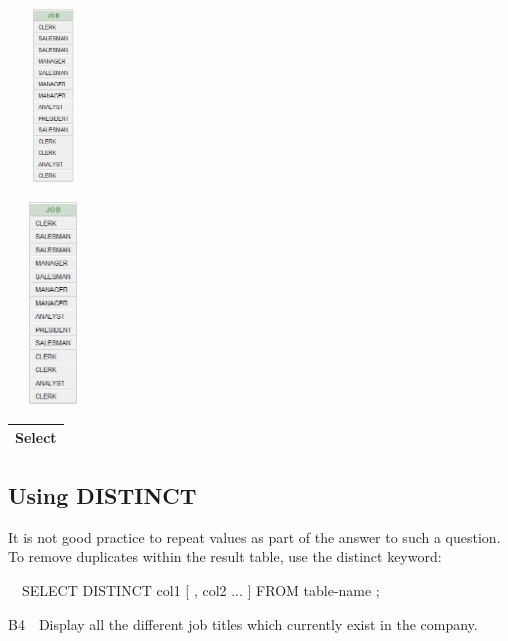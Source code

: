 \begin{center}
  
\includegraphics[width=2.42cm,height=4.623cm]{images/img (20).png}

\end{center}
\begin{center}
  
\includegraphics[width=2.431cm,height=5.398cm]{images/img (20).png}

\end{center}
\begin{flushleft}
\tablefirsthead{}
\tablehead{}
\tabletail{}
\tablelasttail{}
\begin{supertabular}{|m{8.0cm}|}
\hline
Select 

\\\hline
\end{supertabular}
\end{flushleft}
\subsection{Using DISTINCT}
It is not good practice to repeat values as part of the answer to such a question.  To remove duplicates within the result table, use the distinct keyword:

\ \ SELECT DISTINCT col1 [ , col2 ... ]  FROM  table-name ;

B4\ \ Display all the different job titles which currently exist in the company.


